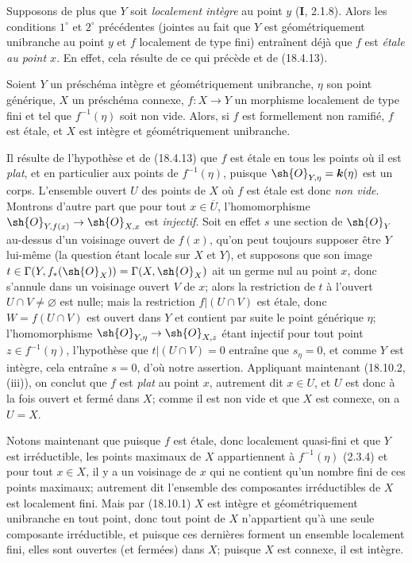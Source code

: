 \begin{remarks}[18.10.2]
\begin{enumerate}
Supposons de plus que $Y$ soit \emph{localement intègre} au point $y$ (\textbf{I}, 2.1.8). Alors les conditions $1^\circ$ et $2^\circ$ précédentes (jointes au fait que $Y$ est géométriquement unibranche au point $y$ et $f$ localement de type fini) entraînent déjà que $f$ est \emph{étale au point $x$}. En effet, cela résulte de ce qui précède et de (18.4.13).
\end{enumerate}
\end{remarks}

\begin{corollary}[18.10.3]
\label{IV.18.10.3}
Soient $Y$ un préschéma intègre et géométriquement unibranche, $\eta$ son point générique, $X$ un préschéma connexe, $f:X\to Y$ un morphisme localement de type fini et tel que $f^{-1}(\eta)$ soit non vide. Alors, si $f$ est formellement non ramifié, $f$ est étale, et $X$ est intègre et géométriquement unibranche.
\end{corollary}

Il résulte de l'hypothèse et de (18.4.13) que $f$ est étale en tous les points où il est \emph{plat}, et en particulier aux points de $f^{-1}(\eta)$, puisque $\sh{O}_{Y,\eta}=\boldsymbol{k}(\eta)$ est un corps. L'ensemble ouvert $U$ des points de $X$ où $f$ est étale est donc \emph{non vide}. Montrons d'autre part que pour tout $x\in\overline U$, l'homomorphisme $\sh{O}_{Y,f(x)}\to\sh{O}_{X,x}$ est \emph{injectif}. Soit en effet $s$ une section de $\sh{O}_Y$ au-dessus d'un voisinage ouvert de $f(x)$, qu'on peut toujours supposer être $Y$ lui-même (la question étant locale sur $X$ et $Y$), et supposons que son image $t\in\Gamma(Y,f_*(\sh{O}_X))=\Gamma(X,\sh{O}_X)$ ait un germe nul au point $x$, donc s'annule dans un voisinage ouvert $V$ de $x$; alors la restriction de $t$ à l'ouvert $U\cap V\neq\varnothing$ est nulle; mais la restriction $f|(U\cap V)$ est étale, donc $W=f(U\cap V)$ est ouvert dans $Y$ et contient par suite le point générique $\eta$; l'homomorphisme $\sh{O}_{Y,\eta}\to\sh{O}_{X,z}$ étant injectif pour tout point $z\in f^{-1}(\eta)$, l'hypothèse que $t|(U\cap V)=0$ entraîne que $s_\eta=0$, et comme $Y$ est intègre, cela entraîne $s=0$, d'où notre assertion. Appliquant maintenant (18.10.2, (iii)), on conclut que $f$ est \emph{plat} au point $x$, autrement dit $x\in U$, et $U$ est donc à la fois ouvert et fermé dans $X$; comme il est non vide et que $X$ est connexe, on a $U=X$.

Notons maintenant que puisque $f$ est étale, donc localement quasi-fini et que $Y$ est irréductible, les points maximaux de $X$ appartiennent à $f^{-1}(\eta)$ (2.3.4) et pour tout $x\in X$, il y a un voisinage de $x$ qui ne contient qu'un nombre fini de ces points maximaux; autrement dit l'ensemble des composantes irréductibles de $X$ est localement fini. Mais par (18.10.1) $X$ est intègre et géométriquement unibranche en tout point, donc tout point de $X$ n'appartient qu'à une seule composante irréductible, et puisque ces dernières forment un ensemble localement fini, elles sont ouvertes (et fermées) dans $X$; puisque $X$ est connexe, il est intègre.


